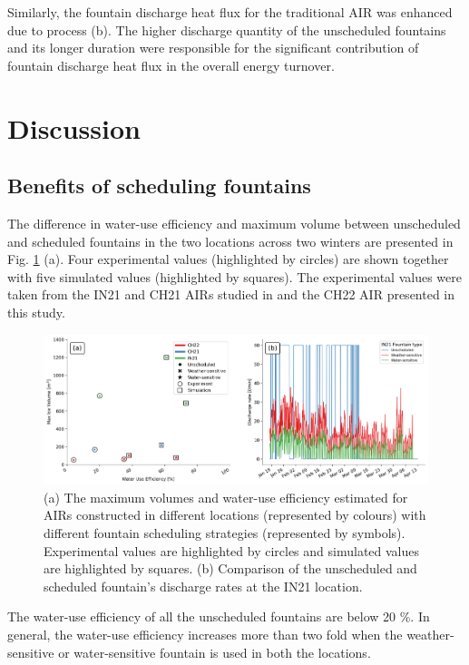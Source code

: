\documentclass[tc, manuscript]{copernicus}
\begin{document}
Similarly, the fountain discharge heat flux for the traditional AIR was enhanced due to process (b). The higher
discharge quantity of the unscheduled fountains and its longer duration were responsible for the significant
contribution of fountain discharge heat flux in the overall energy turnover.

\section{Discussion}

\subsection{Benefits of scheduling fountains}

The difference in water-use efficiency and maximum volume between unscheduled and scheduled fountains in the two
locations across two winters are presented in Fig. \ref{fig:wue} (a). Four experimental values (highlighted by
circles) are shown together with five simulated values (highlighted by squares).  The experimental values were
taken from the IN21 and CH21 AIRs studied in \citet{balasubramanianInfluenceMeteorologicalConditions2022} and
the CH22 AIR presented in this study. 

\begin{figure}[t]
\includegraphics[width=\textwidth]{Figures/wue.png}

\caption{(a) The maximum volumes and water-use efficiency estimated for AIRs constructed in different locations
(represented by colours) with different fountain scheduling strategies (represented by symbols). Experimental
values are highlighted by circles and simulated values are highlighted by squares. (b) Comparison of
the unscheduled and scheduled fountain's discharge rates at the IN21 location.}

\label{fig:wue}
\end{figure}

The water-use efficiency of all the unscheduled fountains are below 20 \%. In general, the water-use efficiency
increases more than two fold when the weather-sensitive or water-sensitive fountain is used in both the locations.  
\end{document}
